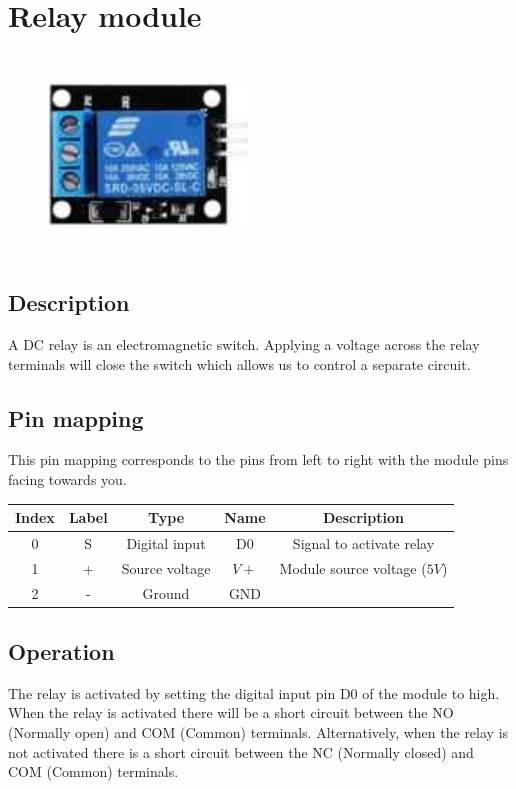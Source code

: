 \section{Relay module}
\begin{figure}[H]
    \centering
    \includegraphics[angle=0, keepaspectratio=true, scale=1, width=200px, height=200px]{images/relay.jpg}
\end{figure}
\subsection*{Description}
A DC relay is an electromagnetic switch. Applying a voltage across the relay terminals will close the switch which allows us to control a separate circuit.

\subsection*{Pin mapping}
This pin mapping corresponds to the pins from left to right with the module pins facing towards you.
\begin{table}[H]
    \centering
    \begin{tabular}{|c|c|c|c|c|}
    \hline
    Index &Label &Type &Name &Description\\ \hline
    0 &S &Digital input &D0 &Signal to activate relay \\ \hline
    1 &+ &Source voltage &$V+$ &Module source voltage ($5V$)\\ \hline
    2 &- &Ground &GND &\\ \hline
    \end{tabular}
\end{table}
\subsection*{Operation}
The relay is activated by setting the digital input pin D0 of the module to high. When the relay is activated there will be a short circuit between the NO (Normally open) and COM (Common) terminals. Alternatively, when the relay is not activated there is a short circuit between the NC (Normally closed) and COM (Common) terminals.
%